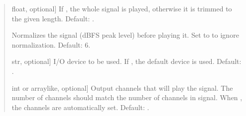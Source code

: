 \documentclass[letterpaper,10pt,english]{sphinxmanual}
\begin{document}
\begin{fulllineitems}
\begin{quote}
\begin{description}
\begin{description}
\sphinxlineitem{\sphinxstylestrong{duration\_seconds}}{[}float, optional{]}
\sphinxAtStartPar
If , the whole signal is played, otherwise it is trimmed to the
given length. Default: .

\sphinxAtStartPar
Normalizes the signal (dBFS peak level) before playing it.
Set to  to ignore normalization. Default: \sphinxhyphen{}6.

\sphinxlineitem{\sphinxstylestrong{device}}{[}str, optional{]}
\sphinxAtStartPar
I/O device to be used. If , the default device is used.
Default: .

\sphinxlineitem{\sphinxstylestrong{play\_channels}}{[}int or array\sphinxhyphen{}like, optional{]}
\sphinxAtStartPar
Output channels that will play the signal. The number of channels
should match the number of channels in signal. When , the
channels are automatically set. Default: .

\end{description}

\end{description}\end{quote}

\end{fulllineitems}

\end{document}
